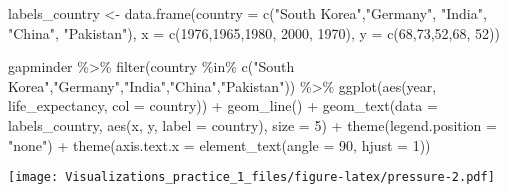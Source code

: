 \documentclass[
]{article}
\newenvironment{Shaded}{\begin{snugshade}}{\end{snugshade}}
\newcommand{\AttributeTok}[1]{\textcolor[rgb]{0.77,0.63,0.00}{#1}}
\newcommand{\DecValTok}[1]{\textcolor[rgb]{0.00,0.00,0.81}{#1}}
\newcommand{\FunctionTok}[1]{\textcolor[rgb]{0.00,0.00,0.00}{#1}}
\newcommand{\NormalTok}[1]{#1}
\newcommand{\OtherTok}[1]{\textcolor[rgb]{0.56,0.35,0.01}{#1}}
\newcommand{\SpecialCharTok}[1]{\textcolor[rgb]{0.00,0.00,0.00}{#1}}
\newcommand{\StringTok}[1]{\textcolor[rgb]{0.31,0.60,0.02}{#1}}
\begin{document}
\begin{Shaded}
\begin{Highlighting}[]
\NormalTok{labels\_country }\OtherTok{\textless{}{-}}
  \FunctionTok{data.frame}\NormalTok{(}\AttributeTok{country =} \FunctionTok{c}\NormalTok{(}\StringTok{"South Korea"}\NormalTok{,}\StringTok{"Germany"}\NormalTok{, }\StringTok{"India"}\NormalTok{, }\StringTok{"China"}\NormalTok{, }\StringTok{"Pakistan"}\NormalTok{), }
                     \AttributeTok{x =} \FunctionTok{c}\NormalTok{(}\DecValTok{1976}\NormalTok{,}\DecValTok{1965}\NormalTok{,}\DecValTok{1980}\NormalTok{, }\DecValTok{2000}\NormalTok{, }\DecValTok{1970}\NormalTok{), }\AttributeTok{y =} \FunctionTok{c}\NormalTok{(}\DecValTok{68}\NormalTok{,}\DecValTok{73}\NormalTok{,}\DecValTok{52}\NormalTok{,}\DecValTok{68}\NormalTok{, }\DecValTok{52}\NormalTok{))}

\NormalTok{gapminder }\SpecialCharTok{\%\textgreater{}\%} 
  \FunctionTok{filter}\NormalTok{(country }\SpecialCharTok{\%in\%} \FunctionTok{c}\NormalTok{(}\StringTok{"South Korea"}\NormalTok{,}\StringTok{"Germany"}\NormalTok{,}\StringTok{"India"}\NormalTok{,}\StringTok{"China"}\NormalTok{,}\StringTok{"Pakistan"}\NormalTok{)) }\SpecialCharTok{\%\textgreater{}\%} 
  \FunctionTok{ggplot}\NormalTok{(}\FunctionTok{aes}\NormalTok{(year, life\_expectancy, }\AttributeTok{col =}\NormalTok{ country)) }\SpecialCharTok{+} \FunctionTok{geom\_line}\NormalTok{() }\SpecialCharTok{+} 
  \FunctionTok{geom\_text}\NormalTok{(}\AttributeTok{data =}\NormalTok{ labels\_country, }\FunctionTok{aes}\NormalTok{(x, y, }\AttributeTok{label =}\NormalTok{ country), }\AttributeTok{size =} \DecValTok{5}\NormalTok{) }\SpecialCharTok{+}
  \FunctionTok{theme}\NormalTok{(}\AttributeTok{legend.position =} \StringTok{"none"}\NormalTok{) }\SpecialCharTok{+} 
  \FunctionTok{theme}\NormalTok{(}\AttributeTok{axis.text.x =} \FunctionTok{element\_text}\NormalTok{(}\AttributeTok{angle =} \DecValTok{90}\NormalTok{, }\AttributeTok{hjust =} \DecValTok{1}\NormalTok{))}
\end{Highlighting}
\end{Shaded}

\texttt{[image: Visualizations\_practice\_1\_files/figure-latex/pressure-2.pdf]}
\end{document}
